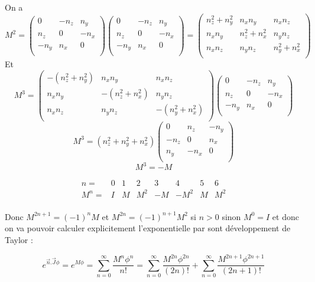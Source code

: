 \documentclass[12pt,a4paper]{article}
\begin{document}
	On a 
	\[
	M^2=\begin{pmatrix}
	0&-n_z&n_y\\
	n_z&0&-n_x\\
	-n_y&n_x&0\\
	\end{pmatrix}\begin{pmatrix}
	0&-n_z&n_y\\
	n_z&0&-n_x\\
	-n_y&n_x&0\\
	\end{pmatrix}=\begin{pmatrix}
	n_z^2+n_y^2&n_x n_y& n_x n_z\\
	n_x n_y&n_z^2+n_x^2& n_y n_z\\
	n_x n_z&n_y n_z&n_y^2+n_x^2\\
	\end{pmatrix}
	\]
	Et 
	\[
	M^3=\begin{pmatrix}
	-(n_z^2+n_y^2)&n_x n_y& n_x n_z\\
	n_x n_y&-(n_z^2+n_x^2)& n_y n_z\\
	n_x n_z&n_y n_z&-(n_y^2+n_x^2)\\
	\end{pmatrix}\begin{pmatrix}
	0&-n_z&n_y\\
	n_z&0&-n_x\\
	-n_y&n_x&0\\
	\end{pmatrix}
	\]
	\[
	M^3=(n_z^2+n_y^2+n_x^2)
	\begin{pmatrix}
	0&n_z&-n_y\\
	-n_z&0&n_x\\
	n_y&-n_x&0\\
	\end{pmatrix}
	\]
	\[
	\boxed{M^3=-M}
	\]
	
	\[
		\begin{array}{c|ccccccc}
		n=&0&1&2&3&4&5&6\\
		\hline
		M^n=&I&M&M^2&-M&-M^2&M&M^2\\
		\end{array}
	\]
	
	
	Donc $M^{2n+1}=(-1)^{n} M$ et $M^{2n}=(-1)^{n+1} M^2$ si $n>0$ sinon $M^0=I$ et donc on va pouvoir calculer explicitement l'exponentielle par sont développement de Taylor :
	
	\[
	e^{\vec{n}.\vec{J}\phi}=e^{M\phi} = \sum_{n=0}^{\infty} \frac{M^n\phi^n}{n!}=\sum_{n=0}^{\infty} \frac{M^{2n}\phi^{2n}}{(2n)!} + \sum_{n=0}^{\infty} \frac{M^{2n+1}\phi^{2n+1}}{(2n+1)!}
	\]
	
\end{document}
